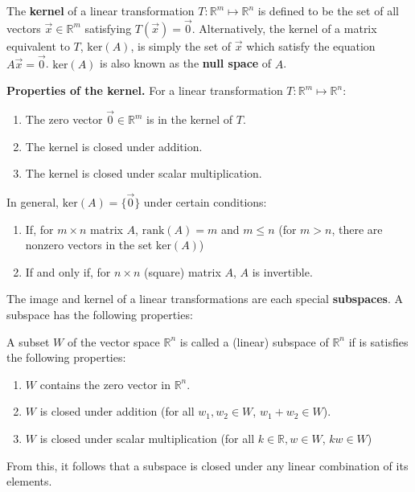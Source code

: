 \vspace{-1em}
The \textbf{kernel} of a linear transformation $T:\mathbb{R}^m\mapsto\mathbb{R}^n$ is defined to be the set of all vectors $\vec{x}\in\mathbb{R}^m$ satisfying $T(\vec{x}) = \vec{0}$. Alternatively, the kernel of a matrix equivalent to $T$, $\text{ker}(A)$, is simply the set of $\vec{x}$ which satisfy the equation $A\vec{x} = \vec{0}$. $\text{ker}(A)$ is also known as the \textbf{null space} of $A$.
\vspace{-0.5em}
\begin{shaded}
\textbf{Properties of the kernel.} For a linear transformation $T:\mathbb{R}^m\mapsto\mathbb{R}^n$:
\begin{center}
\begin{enumerate}
    \item The zero vector $\vec{0}\in\mathbb{R}^m$ is in the kernel of $T$.
    \item The kernel is closed under addition.
    \item The kernel is closed under scalar multiplication.
\end{enumerate}
\end{center}
\end{shaded}
\vspace{-2em}
In general, $\text{ker}(A)=\{\vec{0}\}$ under certain conditions:
\begin{enumerate}
    \item If, for $m\times n$ matrix $A$, $\text{rank}(A)=m$ and $m\leq n$ (for $m>n$, there are nonzero vectors in the set $\text{ker}(A)$)
    \item If and only if, for $n\times n$ (square) matrix $A$, $A$ is invertible.
\end{enumerate}
\vspace{-1em}
The image and kernel of a linear transformations are each special \textbf{subspaces}. A subspace has the following properties:
\vspace{-0.5em}
\begin{shaded}
    A subset $W$ of the vector space $\mathbb{R}^n$ is called a (linear) subspace of $\mathbb{R}^n$ if is satisfies the following properties:
    \begin{center}
    \begin{enumerate}
        \item $W$ contains the zero vector in $\mathbb{R}^n$.
        \item $W$ is closed under addition (for all $w_1,w_2\in W$, $w_1 + w_2 \in W$).
        \item $W$ is closed under scalar multiplication (for all $k\in\mathbb{R}, w\in W$, $kw\in W$)
    \end{enumerate}
    \end{center}
\end{shaded}
\vspace{-1em}
From this, it follows that a subspace is closed under any linear combination of its elements.

